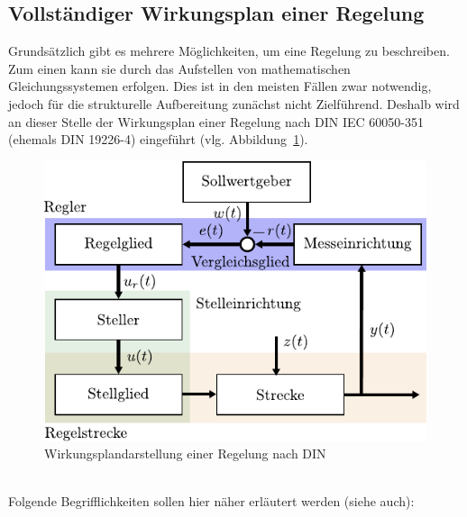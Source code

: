 \subsection{Vollständiger Wirkungsplan einer Regelung}
%
Grundsätzlich gibt es mehrere Möglichkeiten, um eine Regelung zu beschreiben. Zum einen kann sie durch das Aufstellen von mathematischen Gleichungssystemen erfolgen. Dies ist in den meisten Fällen zwar notwendig, jedoch für die strukturelle Aufbereitung zunächst nicht Zielführend. Deshalb wird an dieser Stelle der Wirkungsplan einer Regelung nach DIN IEC 60050-351 (ehemals DIN 19226-4) \cite{DKE14} eingeführt (vlg. Abbildung~\ref{fig:regelkreisdin}).
%
\begin{figure}[h]
	\centering
	\includegraphics[width=0.70\linewidth]{Abbildungen/Grundbegriffe/PDF/VollstWirkungsplan.pdf}
	\caption{Wirkungsplandarstellung einer Regelung nach DIN}
	\label{fig:regelkreisdin}
\end{figure}\\
%
Folgende Begrifflichkeiten sollen hier näher erläutert werden (siehe auch\cite{Foellinger94}\cite{MSF05}):
